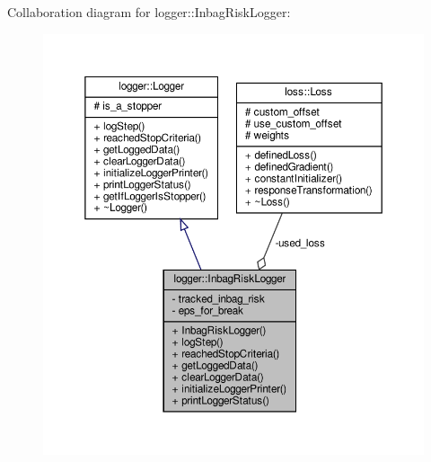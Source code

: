 Collaboration diagram for logger\+:\+:Inbag\+Risk\+Logger\+:
\nopagebreak
\begin{figure}[H]
\begin{center}
\leavevmode
\includegraphics[width=350pt]{classlogger_1_1_inbag_risk_logger__coll__graph}
\end{center}
\end{figure}
